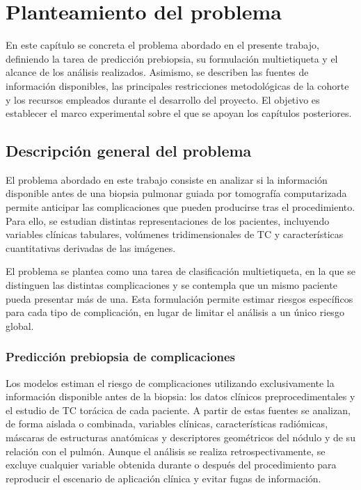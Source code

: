 \chapter{Planteamiento del problema}\label{chap:planteamiento_problema}

En este capítulo se concreta el problema abordado en el presente trabajo, definiendo la tarea de predicción prebiopsia, su formulación multietiqueta y el alcance de los análisis realizados. Asimismo, se describen las fuentes de información disponibles, las principales restricciones metodológicas de la cohorte y los recursos empleados durante el desarrollo del proyecto. El objetivo es establecer el marco experimental sobre el que se apoyan los capítulos posteriores.

\section{Descripción general del problema}

El problema abordado en este trabajo consiste en analizar si la información disponible antes de una biopsia pulmonar guiada por tomografía computarizada permite anticipar las complicaciones que pueden producirse tras el procedimiento. Para ello, se estudian distintas representaciones de los pacientes, incluyendo variables clínicas tabulares, volúmenes tridimensionales de TC y características cuantitativas derivadas de las imágenes.

El problema se plantea como una tarea de clasificación multietiqueta, en la que se distinguen las distintas complicaciones y se contempla que un mismo paciente pueda presentar más de una. Esta formulación permite estimar riesgos específicos para cada tipo de complicación, en lugar de limitar el análisis a un único riesgo global.

\subsection{Predicción prebiopsia de complicaciones}

Los modelos estiman el riesgo de complicaciones utilizando exclusivamente la información disponible antes de la biopsia: los datos clínicos preprocedimentales y el estudio de TC torácica de cada paciente. A partir de estas fuentes se analizan, de forma aislada o combinada, variables clínicas, características radiómicas, máscaras de estructuras anatómicas y descriptores geométricos del nódulo y de su relación con el pulmón. Aunque el análisis se realiza retrospectivamente, se excluye cualquier variable obtenida durante o después del procedimiento para reproducir el escenario de aplicación clínica y evitar fugas de información.

